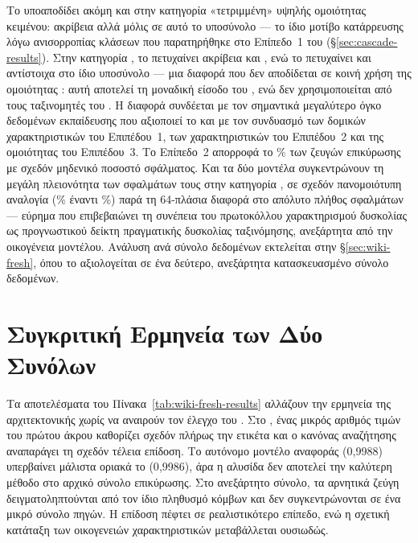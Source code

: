 Το  υποαποδίδει ακόμη και στην κατηγορία «τετριμμένη» υψηλής ομοιότητας
κειμένου: ακρίβεια \SvmHighTextsimAcc{} αλλά  μόλις \SvmHighTextsimFone{} σε αυτό το υποσύνολο ---
το ίδιο μοτίβο κατάρρευσης λόγω ανισορροπίας κλάσεων που παρατηρήθηκε στο Επίπεδο~1
του  (\S\ref{sec:cascade-results}).
Στην κατηγορία , το 
πετυχαίνει ακρίβεια \SvmHardAcc{} και  \SvmHardFone{}, ενώ το 
πετυχαίνει \CascadeHardAcc{} και \CascadeHardFone{} αντίστοιχα στο ίδιο υποσύνολο --- μια διαφορά που δεν
αποδίδεται σε κοινή χρήση της ομοιότητας : αυτή αποτελεί τη μοναδική
είσοδο του , ενώ δεν χρησιμοποιείται από τους ταξινομητές του
.
Η διαφορά συνδέεται με τον σημαντικά μεγαλύτερο όγκο δεδομένων
εκπαίδευσης που αξιοποιεί το  και με τον συνδυασμό των δομικών
χαρακτηριστικών του Επιπέδου~1, των χαρακτηριστικών  του Επιπέδου~2 και
της ομοιότητας  του Επιπέδου~3.
Το Επίπεδο~2 απορροφά το \TierTwoPct\%
των ζευγών επικύρωσης με σχεδόν μηδενικό ποσοστό σφάλματος.
Και τα δύο μοντέλα
συγκεντρώνουν τη μεγάλη πλειονότητα των σφαλμάτων τους στην κατηγορία , σε
σχεδόν πανομοιότυπη αναλογία (\CascadeErrorsHardPct\% έναντι \SvmErrorsHardPct\%) παρά τη 64-πλάσια διαφορά
στο απόλυτο πλήθος σφαλμάτων --- εύρημα που επιβεβαιώνει τη συνέπεια του πρωτοκόλλου
χαρακτηρισμού δυσκολίας ως προγνωστικού δείκτη πραγματικής δυσκολίας ταξινόμησης,
ανεξάρτητα από την οικογένεια μοντέλου.
Ανάλυση ανά σύνολο δεδομένων εκτελείται στην \S\ref{sec:wiki-fresh}, όπου το
 αξιολογείται σε ένα δεύτερο, ανεξάρτητα κατασκευασμένο σύνολο
δεδομένων.




\section{Συγκριτική Ερμηνεία των Δύο Συνόλων}
\label{sec:cross-dataset-discussion}

Τα αποτελέσματα του Πίνακα~\ref{tab:wiki-fresh-results} αλλάζουν την ερμηνεία
της αρχιτεκτονικής χωρίς να αναιρούν τον έλεγχο του .
Στο
, ένας μικρός αριθμός τιμών του πρώτου άκρου καθορίζει σχεδόν πλήρως
την ετικέτα και ο κανόνας αναζήτησης αναπαράγει τη σχεδόν τέλεια επίδοση.
Το αυτόνομο μοντέλο αναφοράς  (0{,}9988) υπερβαίνει μάλιστα οριακά το
 (0{,}9986), άρα η αλυσίδα δεν αποτελεί την καλύτερη μέθοδο στο
αρχικό σύνολο επικύρωσης.
Στο
ανεξάρτητο σύνολο, τα αρνητικά ζεύγη δειγματοληπτούνται από τον ίδιο πληθυσμό
κόμβων και δεν συγκεντρώνονται σε ένα μικρό σύνολο πηγών.
Η επίδοση πέφτει σε
ρεαλιστικότερο επίπεδο, ενώ η σχετική κατάταξη των οικογενειών χαρακτηριστικών
μεταβάλλεται ουσιωδώς.

